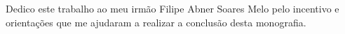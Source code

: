 Dedico este trabalho ao meu irmão Filipe Abner Soares Melo pelo incentivo e orientações que me ajudaram a realizar a conclusão desta monografia. 